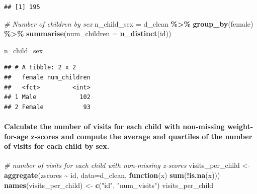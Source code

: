 \documentclass[
]{article}
\newenvironment{Shaded}{\begin{snugshade}}{\end{snugshade}}
\newcommand{\AttributeTok}[1]{\textcolor[rgb]{0.13,0.29,0.53}{#1}}
\newcommand{\CommentTok}[1]{\textcolor[rgb]{0.56,0.35,0.01}{\textit{#1}}}
\newcommand{\ControlFlowTok}[1]{\textcolor[rgb]{0.13,0.29,0.53}{\textbf{#1}}}
\newcommand{\FunctionTok}[1]{\textcolor[rgb]{0.13,0.29,0.53}{\textbf{#1}}}
\newcommand{\NormalTok}[1]{#1}
\newcommand{\OtherTok}[1]{\textcolor[rgb]{0.56,0.35,0.01}{#1}}
\newcommand{\SpecialCharTok}[1]{\textcolor[rgb]{0.81,0.36,0.00}{\textbf{#1}}}
\newcommand{\StringTok}[1]{\textcolor[rgb]{0.31,0.60,0.02}{#1}}
\begin{document}
\begin{Shaded}
\end{Shaded}

\begin{verbatim}
## [1] 195
\end{verbatim}

\begin{Shaded}
\begin{Highlighting}[]
\CommentTok{\# Number of children by sex}
\NormalTok{n\_child\_sex }\OtherTok{=}\NormalTok{ d\_clean }\SpecialCharTok{\%\textgreater{}\%}
 \FunctionTok{group\_by}\NormalTok{(female) }\SpecialCharTok{\%\textgreater{}\%}
 \FunctionTok{summarise}\NormalTok{(}\AttributeTok{num\_children =} \FunctionTok{n\_distinct}\NormalTok{(id))}

\NormalTok{n\_child\_sex}
\end{Highlighting}
\end{Shaded}

\begin{verbatim}
## # A tibble: 2 x 2
##   female num_children
##   <fct>         <int>
## 1 Male            102
## 2 Female           93
\end{verbatim}

\hypertarget{calculate-the-number-of-visits-for-each-child-with-non-missing-weight-for-age-z-scores-and-compute-the-average-and-quartiles-of-the-number-of-visits-for-each-child-by-sex.}{%
\paragraph{Calculate the number of visits for each child with
non-missing weight-for-age z-scores and compute the average and
quartiles of the number of visits for each child by
sex.}\label{calculate-the-number-of-visits-for-each-child-with-non-missing-weight-for-age-z-scores-and-compute-the-average-and-quartiles-of-the-number-of-visits-for-each-child-by-sex.}}

\begin{Shaded}
\begin{Highlighting}[]
\CommentTok{\# number of visits for each child with non{-}missing z{-}scores }
\NormalTok{visits\_per\_child }\OtherTok{\textless{}{-}} \FunctionTok{aggregate}\NormalTok{(zscores }\SpecialCharTok{\textasciitilde{}}\NormalTok{ id, }\AttributeTok{data=}\NormalTok{d\_clean, }\ControlFlowTok{function}\NormalTok{(x) }\FunctionTok{sum}\NormalTok{(}\SpecialCharTok{!}\FunctionTok{is.na}\NormalTok{(x)))}
\FunctionTok{names}\NormalTok{(visits\_per\_child) }\OtherTok{\textless{}{-}} \FunctionTok{c}\NormalTok{(}\StringTok{"id"}\NormalTok{, }\StringTok{"num\_visits"}\NormalTok{)}
\NormalTok{visits\_per\_child}
\end{Highlighting}
\end{Shaded}
\end{document}
